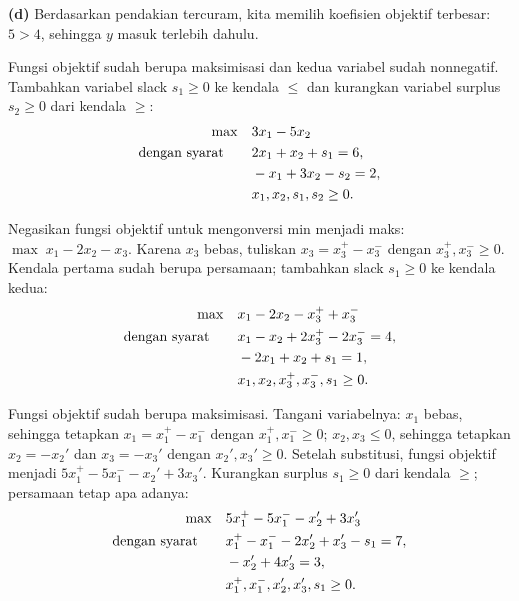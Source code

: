 \textbf{(d)} Berdasarkan pendakian tercuram, kita memilih koefisien objektif
terbesar: $5 > 4$, sehingga $y$ masuk terlebih dahulu.


Fungsi objektif sudah berupa maksimisasi dan kedua variabel sudah
nonnegatif. Tambahkan variabel slack $s_1 \geq 0$ ke kendala $\leq$ dan
kurangkan variabel surplus $s_2 \geq 0$ dari kendala $\geq$:
\[
\begin{aligned}
\max \quad & 3x_1 - 5x_2 \\
\mbox{dengan syarat}\quad \quad & 2x_1 + x_2 + s_1 = 6, \\
& -x_1 + 3x_2 - s_2 = 2, \\
& x_1, x_2, s_1, s_2 \geq 0.
\end{aligned}
\]


Negasikan fungsi objektif untuk mengonversi min menjadi maks: $\max\; x_1 - 2x_2 - x_3$.
Karena $x_3$ bebas, tuliskan $x_3 = x_3^+ - x_3^-$ dengan
$x_3^+, x_3^- \geq 0$. Kendala pertama sudah berupa persamaan; tambahkan
slack $s_1 \geq 0$ ke kendala kedua:
\[
\begin{aligned}
\max \quad & x_1 - 2x_2 - x_3^+ + x_3^- \\
\mbox{dengan syarat}\quad \quad & x_1 - x_2 + 2x_3^+ - 2x_3^- = 4, \\
& -2x_1 + x_2 + s_1 = 1, \\
& x_1, x_2, x_3^+, x_3^-, s_1 \geq 0.
\end{aligned}
\]


Fungsi objektif sudah berupa maksimisasi. Tangani variabelnya: $x_1$
bebas, sehingga tetapkan $x_1 = x_1^+ - x_1^-$ dengan $x_1^+, x_1^- \geq 0$;
$x_2, x_3 \leq 0$, sehingga tetapkan $x_2 = -x_2'$ dan $x_3 = -x_3'$ dengan
$x_2', x_3' \geq 0$. Setelah substitusi, fungsi objektif menjadi
$5x_1^+ - 5x_1^- - x_2' + 3x_3'$. Kurangkan surplus $s_1 \geq 0$ dari
kendala $\geq$; persamaan tetap apa adanya:
\[
\begin{aligned}
\max \quad & 5x_1^+ - 5x_1^- - x_2' + 3x_3' \\
\mbox{dengan syarat}\quad \quad & x_1^+ - x_1^- - 2x_2' + x_3' - s_1 = 7, \\
& -x_2' + 4x_3' = 3, \\
& x_1^+, x_1^-, x_2', x_3', s_1 \geq 0.
\end{aligned}
\]


